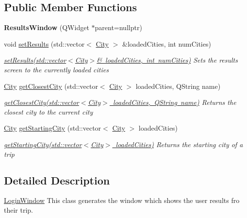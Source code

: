 \subsection*{Public Member Functions}
\begin{DoxyCompactItemize}
\item 
\mbox{\label{class_results_window_ab5eed3b399c8a305f588d4a98fb3a9ed}} 
{\bfseries Results\+Window} (Q\+Widget $\ast$parent=nullptr)
\item 
void \mbox{\hyperlink{class_results_window_ab8b52e8d3719ffe9dc789ab9a4507906}{set\+Results}} (std\+::vector$<$ \mbox{\hyperlink{class_city}{City}} $>$ \&loaded\+Cities, int num\+Cities)
\begin{DoxyCompactList}\small\item\em \mbox{\hyperlink{class_results_window_ab8b52e8d3719ffe9dc789ab9a4507906}{set\+Results(std\+::vector$<$\+City$>$\& loaded\+Cities, int num\+Cities)}} Sets the results screen to the currently loaded cities \end{DoxyCompactList}\item 
\mbox{\hyperlink{class_city}{City}} \mbox{\hyperlink{class_results_window_ad58645a2626daa51d8e824d56df7145f}{get\+Closest\+City}} (std\+::vector$<$ \mbox{\hyperlink{class_city}{City}} $>$ loaded\+Cities, Q\+String name)
\begin{DoxyCompactList}\small\item\em \mbox{\hyperlink{class_results_window_ad58645a2626daa51d8e824d56df7145f}{get\+Closest\+City(std\+::vector$<$\+City$>$ loaded\+Cities, Q\+String name)}} Returns the closest city to the current city \end{DoxyCompactList}\item 
\mbox{\hyperlink{class_city}{City}} \mbox{\hyperlink{class_results_window_ae9d02be8b007fcbc61f6d6536ba1520f}{get\+Starting\+City}} (std\+::vector$<$ \mbox{\hyperlink{class_city}{City}} $>$ loaded\+Cities)
\begin{DoxyCompactList}\small\item\em \mbox{\hyperlink{class_results_window_ae9d02be8b007fcbc61f6d6536ba1520f}{get\+Starting\+City(std\+::vector$<$\+City$>$ loaded\+Cities)}} Returns the starting city of a trip \end{DoxyCompactList}\end{DoxyCompactItemize}


\subsection{Detailed Description}
\mbox{\hyperlink{class_login_window}{Login\+Window}} This class generates the window which shows the user results fro their trip. 

